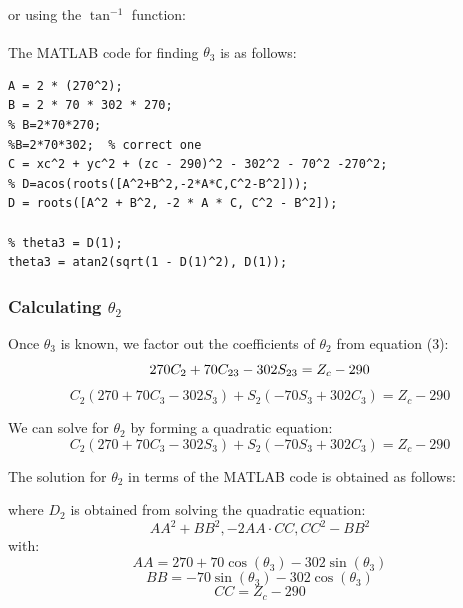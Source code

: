 \begin{center}
\end{center}


\noindent or using the \(\tan^{-1}\) function:

\begin{center}
\end{center}



\noindent The MATLAB\textsuperscript{\textregistered} code for finding \(\theta_3\) is as follows:
\begin{lstlisting}[frame=single,style=Matlab-editor]
% three equations from wrist position
A = 2 * (270^2);
B = 2 * 70 * 302 * 270;
% B=2*70*270;
%B=2*70*302;  % correct one
C = xc^2 + yc^2 + (zc - 290)^2 - 302^2 - 70^2 -270^2;
% D=acos(roots([A^2+B^2,-2*A*C,C^2-B^2]));
D = roots([A^2 + B^2, -2 * A * C, C^2 - B^2]);

% theta3 = D(1);
theta3 = atan2(sqrt(1 - D(1)^2), D(1));
\end{lstlisting}

\subsubsection{Calculating \texorpdfstring{$\theta_2$}{theta2}}

Once \(\theta_3\) is known, we factor out the coefficients of \(\theta_2\) from equation (3):
\[
  270C_2 + 70C_{23} - 302S_{23} = Z_c - 290 \\
\]
\noindent
\[
  C_2 \left( 270 + 70 C_3 - 302 S_3 \right) + S_2 \left( -70 S_3 + 302 C_3 \right) = Z_c - 290
\]


\noindent We can solve for \(\theta_2\) by forming a quadratic equation:
\[
  C_2 \left( 270 + 70 C_3 - 302 S_3 \right) + S_2 \left( -70 S_3 + 302 C_3 \right) = Z_c - 290
\]

The solution for \(\theta_2\) in terms of the MATLAB code is obtained as follows:

\begin{center}
\end{center}
where \( D_2 \) is obtained from solving the quadratic equation:
\[
  AA^2 + BB^2, -2AA \cdot CC, CC^2 - BB^2
\]
with:
\[
  AA = 270 + 70 \cos(\theta_3) - 302 \sin(\theta_3)
\]
\[
  BB = -70 \sin(\theta_3) - 302 \cos(\theta_3)
\]
\[
  CC = Z_c - 290
\]

